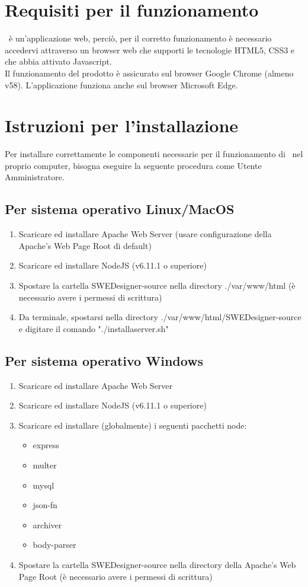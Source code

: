 \documentclass[../ManualeUtente.tex]{subfiles}
\begin{document}
	\section{Requisiti per il funzionamento}
		\progetto\ è un'applicazione web, perciò, per il corretto funzionamento
		è necessario accedervi attraverso un browser web che supporti le
		tecnologie HTML5, CSS3 e che abbia attivato Javascript.\\
		Il funzionamento del prodotto è assicurato sul browser Google Chrome (almeno v58).
		L'applicazione funziona anche sul browser Microsoft Edge.
	\section{Istruzioni per l'installazione}\label{sez:installIstr}
		Per installare correttamente le componenti necessarie per il funzionamento di \progetto\ nel proprio computer,
		bisogna eseguire la seguente procedura come Utente Amministratore.
		\subsection{Per sistema operativo Linux/MacOS}
			\begin{enumerate}
				\item Scaricare ed installare Apache Web Server (usare configurazione della
				Apache's Web Page Root di default)
				\item Scaricare ed installare NodeJS (v6.11.1 o superiore)
	 			\item Spostare la cartella SWEDesigner-source nella directory ./var/www/html
	 			(è necessario avere i permessi di scrittura)
	 			\item Da terminale, spostarsi nella directory ./var/www/html/SWEDesigner-source e digitare il comando
	 			"./installaserver.sh"
			\end{enumerate}
		\subsection{Per sistema operativo Windows}
			\begin{enumerate}
				\item Scaricare ed installare Apache Web Server
	 			\item Scaricare ed installare NodeJS (v6.11.1 o superiore)
 				\item Scaricare ed installare (globalmente) i seguenti pacchetti node:
 				\begin{itemize}
 					\item express
 					\item multer
 					\item mysql
 					\item json-fn
 					\item archiver
 					\item body-parser
 				\end{itemize}
 				\item Spostare la cartella SWEDesigner-source nella directory della Apache's Web Page Root
 				(è necessario avere i permessi di scrittura)
			\end{enumerate}
\end{document}
